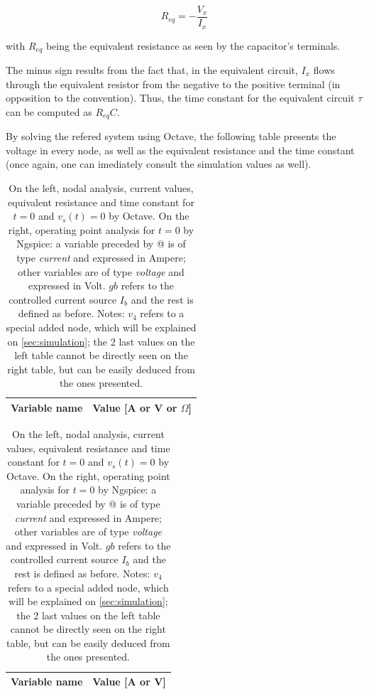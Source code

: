 \begin{equation}
  R_{eq}=-\frac{V_x}{I_x}
\end{equation}

with $R_{eq}$ being the equivalent resistance as seen by the capacitor's terminals.

\vspace{3mm}
\par The minus sign results from the fact that, in the equivalent circuit, $I_x$ flows through the equivalent resistor from the negative to the positive terminal (in opposition to the convention).
Thus, the time constant for the equivalent circuit $\tau$  can be computed as $R_{eq}C$.

\vspace{3mm}
\par By solving the refered system using Octave, the following table presents the voltage in every node, as well as the equivalent resistance and the time constant (once again, one can imediately consult the simulation values as well).



\renewcommand{\arraystretch}{1.5}
\begin{table}[htbp]
\begin{minipage}{.3\textwidth}
\centering

\begin{tabular}{|c|c|}
\hline    
\textbf{Variable name} & \textbf{Value [A or V or $\Omega$]} \\ \hline

\end{tabular}
\end{minipage}
\hspace{50px}
\begin {minipage}{.8\textwidth}
\centering

\begin{tabular}{|c|c|}
\hline    
\textbf{Variable name} & \textbf{Value [A or V]} \\ \hline

\end{tabular}
\end{minipage}
\caption{On the left, nodal analysis, current values, equivalent resistance and time constant for $t=0$ and $v_s(t)=0$ by Octave. On the right, operating point analysis for $t=0$ by Ngspice: a variable preceded by @ is of type \textit{current} and expressed in Ampere; other variables are of type \textit {voltage} and expressed in Volt. $gb$ refers to the controlled current source $I_b$ and the rest is defined as before. \small Notes: $v_4$ refers to a special added node, which will be explained on \ref{sec:simulation}; the 2 last values on the left table cannot be directly seen on the right table, but can be easily deduced from the ones presented.}
\label{tab_2}
\end{table}


